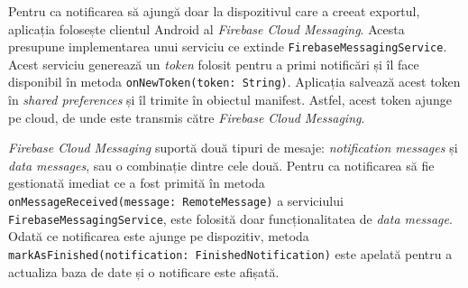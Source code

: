 Pentru ca notificarea să ajungă doar la dispozitivul care a creeat exportul, aplicația folosește clientul Android al \emph{Firebase Cloud Messaging}. Acesta presupune implementarea unui serviciu ce extinde \texttt{FirebaseMessagingService}. Acest serviciu generează un \emph{token} folosit pentru a primi notificări și îl face disponibil în metoda \texttt{onNewToken(token:\ String)}. Aplicația salvează acest token în \emph{shared preferences} și îl trimite în obiectul manifest. Astfel, acest token ajunge pe cloud, de unde este transmis către \emph{Firebase Cloud Messaging}.

\emph{Firebase Cloud Messaging} suportă două tipuri de mesaje: \emph{notification messages} și \emph{data messages}, sau o combinație dintre cele două. Pentru ca notificarea să fie gestionată imediat ce a fost primită în metoda \texttt{onMessageReceived(message:\ RemoteMessage)} a serviciului \texttt{FirebaseMessagingService}, este folosită doar funcționalitatea de \emph{data message}. Odată ce notificarea este ajunge pe dispozitiv, metoda \texttt{markAsFinished(notification:\ FinishedNotification)} este apelată pentru a actualiza baza de date și o notificare este afișată.

